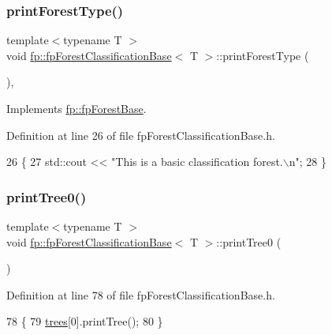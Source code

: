 \subsubsection{\texorpdfstring{print\+Forest\+Type()}{printForestType()}}
{\footnotesize\ttfamily template$<$typename T $>$ \\
void \hyperlink{classfp_1_1fpForestClassificationBase}{fp\+::fp\+Forest\+Classification\+Base}$<$ T $>$\+::print\+Forest\+Type (\begin{DoxyParamCaption}{ }\end{DoxyParamCaption})\hspace{0.3cm}{\ttfamily [inline]}, {\ttfamily [virtual]}}



Implements \hyperlink{classfp_1_1fpForestBase_a5e200f603cca94bb5d9f357489f07e97}{fp\+::fp\+Forest\+Base}.



Definition at line 26 of file fp\+Forest\+Classification\+Base.\+h.


\begin{DoxyCode}
26                                   \{
27                 std::cout << \textcolor{stringliteral}{"This is a basic classification forest.\(\backslash\)n"};
28             \}
\end{DoxyCode}
\mbox{\label{classfp_1_1fpForestClassificationBase_a1989f90fbd27ac90232b7a1071c96a00}} 
\subsubsection{\texorpdfstring{print\+Tree0()}{printTree0()}}
{\footnotesize\ttfamily template$<$typename T $>$ \\
void \hyperlink{classfp_1_1fpForestClassificationBase}{fp\+::fp\+Forest\+Classification\+Base}$<$ T $>$\+::print\+Tree0 (\begin{DoxyParamCaption}{ }\end{DoxyParamCaption})\hspace{0.3cm}{\ttfamily [inline]}}



Definition at line 78 of file fp\+Forest\+Classification\+Base.\+h.


\begin{DoxyCode}
78                              \{
79                 \hyperlink{classfp_1_1fpForestClassificationBase_a51482a6c95c4b3cb42627f029c2d4662}{trees}[0].printTree();
80             \}
\end{DoxyCode}
\mbox{\label{classfp_1_1fpForestClassificationBase_a3f1ad5a5cfb3633713d0a81bd1c356e8}} 
